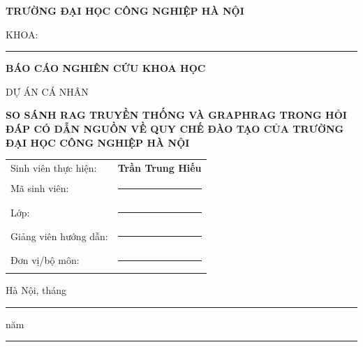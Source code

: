 \documentclass[12pt,a4paper]{extarticle}
\newcommand{\blankfield}{\rule{5.1cm}{0.3pt}}
\begin{document}
\begin{titlepage}
\thispagestyle{empty}
\centering
\vspace*{.9cm}
{\fontsize{15}{21}\selectfont\bfseries TRƯỜNG ĐẠI HỌC CÔNG NGHIỆP HÀ NỘI\par}
\vspace{.35cm}
{\fontsize{14}{20}\selectfont KHOA: \rule{6cm}{.3pt}\par}
\vspace{2cm}
{\fontsize{19}{27}\selectfont\bfseries BÁO CÁO NGHIÊN CỨU KHOA HỌC\par}
\vspace{.3cm}
{\fontsize{14}{20}\selectfont DỰ ÁN CÁ NHÂN\par}
\vspace{1.1cm}
{\fontsize{18}{26}\selectfont\bfseries SO SÁNH RAG TRUYỀN THỐNG VÀ GRAPHRAG TRONG HỎI ĐÁP CÓ DẪN NGUỒN VỀ QUY CHẾ ĐÀO TẠO CỦA TRƯỜNG ĐẠI HỌC CÔNG NGHIỆP HÀ NỘI\par}
\vspace{1.6cm}
\begin{tabular}{ll}
Sinh viên thực hiện: & \textbf{Trần Trung Hiếu}\\[.35cm]
Mã sinh viên: & \blankfield\\[.35cm]
Lớp: & \blankfield\\[.35cm]
Giảng viên hướng dẫn: & \blankfield\\[.35cm]
Đơn vị/bộ môn: & \blankfield
\end{tabular}
\vfill
{\fontsize{14}{20}\selectfont Hà Nội, tháng \rule{1cm}{.3pt} năm \rule{1.3cm}{.3pt}\par}
\vspace{.7cm}
\end{titlepage}
\setcounter{tocdepth}{1}
\tableofcontents
\clearpage

\clearpage
{}








\clearpage

\clearpage

\end{document}
